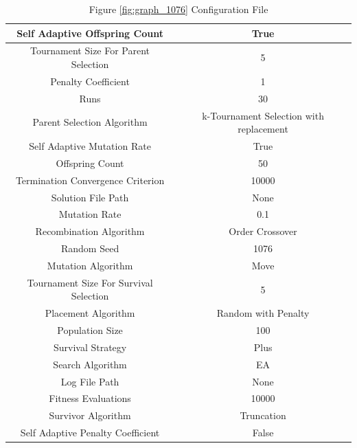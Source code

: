 \documentclass{standalone}
\begin{document}
\begin{table}[!htb]
	\centering
	\caption{Figure \ref{fig:graph_1076} Configuration File}
	\label{tab:graph_1076}
	\begin{tabular}{| c | c |}
		\hline
		Self Adaptive Offspring Count		& True		 \\
		\hline
		Tournament Size For Parent Selection		& 5		 \\
		\hline
		Penalty Coefficient		& 1		 \\
		\hline
		Runs		& 30		 \\
		\hline
		Parent Selection Algorithm		& k-Tournament Selection with replacement		 \\
		\hline
		Self Adaptive Mutation Rate		& True		 \\
		\hline
		Offspring Count		& 50		 \\
		\hline
		Termination Convergence Criterion		& 10000		 \\
		\hline
		Solution File Path		& None		 \\
		\hline
		Mutation Rate		& 0.1		 \\
		\hline
		Recombination Algorithm		& Order Crossover		 \\
		\hline
		Random Seed		& 1076		 \\
		\hline
		Mutation Algorithm		& Move		 \\
		\hline
		Tournament Size For Survival Selection		& 5		 \\
		\hline
		Placement Algorithm		& Random with Penalty		 \\
		\hline
		Population Size		& 100		 \\
		\hline
		Survival Strategy		& Plus		 \\
		\hline
		Search Algorithm		& EA		 \\
		\hline
		Log File Path		& None		 \\
		\hline
		Fitness Evaluations		& 10000		 \\
		\hline
		Survivor Algorithm		& Truncation		 \\
		\hline
		Self Adaptive Penalty Coefficient		& False		 \\
		\hline
	\end{tabular}
\end{table}
\end{document}
